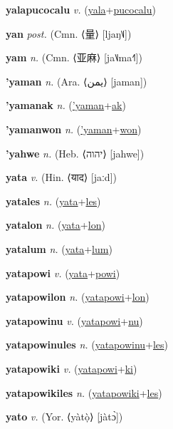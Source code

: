 \textbf{\hypertarget{yalapucocalu}{yalapucocalu}} \textit{v.} (\hyperlink{yala}{yala}+\allowbreak \hyperlink{pucocalu}{pucocalu})


\textbf{\hypertarget{yan}{yan}} \textit{post.} (Cmn. ⟨{\chinese{}量}⟩ [ljaŋ˥˩])


\textbf{\hypertarget{yam}{yam}} \textit{n.} (Cmn. ⟨{\chinese{}亚麻}⟩ [ja˥˩ma˧˥])


\textbf{\hypertarget{'yaman}{'yaman}} \textit{n.} (Ara. ⟨{\arabics{}يمن}⟩ [jaman])


\textbf{\hypertarget{'yamanak}{'yamanak}} \textit{n.} (\hyperlink{'yaman}{'yaman}+\allowbreak \hyperlink{ak}{ak})


\textbf{\hypertarget{'yamanwon}{'yamanwon}} \textit{n.} (\hyperlink{'yaman}{'yaman}+\allowbreak \hyperlink{won}{won})


\textbf{\hypertarget{'yahwe}{'yahwe}} \textit{n.} (Heb. ⟨{\hebrew{}יהוה‬}⟩ [jahwe])


\textbf{\hypertarget{yata}{yata}} \textit{v.} (Hin. ⟨{\devanagari{}याद}⟩ [jaːd])


\textbf{\hypertarget{yatales}{yatales}} \textit{n.} (\hyperlink{yata}{yata}+\allowbreak \hyperlink{les}{les})


\textbf{\hypertarget{yatalon}{yatalon}} \textit{n.} (\hyperlink{yata}{yata}+\allowbreak \hyperlink{lon}{lon})


\textbf{\hypertarget{yatalum}{yatalum}} \textit{n.} (\hyperlink{yata}{yata}+\allowbreak \hyperlink{lum}{lum})


\textbf{\hypertarget{yatapowi}{yatapowi}} \textit{v.} (\hyperlink{yata}{yata}+\allowbreak \hyperlink{powi}{powi})


\textbf{\hypertarget{yatapowilon}{yatapowilon}} \textit{n.} (\hyperlink{yatapowi}{yatapowi}+\allowbreak \hyperlink{lon}{lon})


\textbf{\hypertarget{yatapowinu}{yatapowinu}} \textit{v.} (\hyperlink{yatapowi}{yatapowi}+\allowbreak \hyperlink{nu}{nu})


\textbf{\hypertarget{yatapowinules}{yatapowinules}} \textit{n.} (\hyperlink{yatapowinu}{yatapowinu}+\allowbreak \hyperlink{les}{les})


\textbf{\hypertarget{yatapowiki}{yatapowiki}} \textit{v.} (\hyperlink{yatapowi}{yatapowi}+\allowbreak \hyperlink{ki}{ki})


\textbf{\hypertarget{yatapowikiles}{yatapowikiles}} \textit{n.} (\hyperlink{yatapowiki}{yatapowiki}+\allowbreak \hyperlink{les}{les})


\textbf{\hypertarget{yato}{yato}} \textit{v.} (Yor. ⟨yàtọ̀⟩ [jàtɔ̀])


